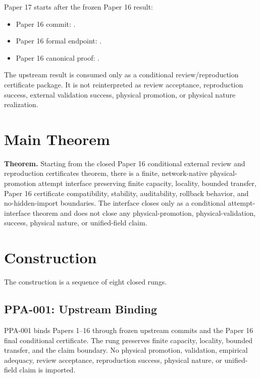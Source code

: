 \documentclass{article}
\begin{document}
Paper 17 starts after the frozen Paper 16 result:
\begin{itemize}
\item Paper 16 commit:
.
\item Paper 16 formal endpoint:
.
\item Paper 16 canonical proof:
.
\end{itemize}

The upstream result is consumed only as a conditional review/reproduction
certificate package. It is not reinterpreted as review acceptance,
reproduction success, external validation success, physical promotion, or
physical nature realization.

\section{Main Theorem}

\textbf{Theorem.} Starting from the closed Paper 16 conditional external
review and reproduction certificates theorem, there is a finite,
network-native physical-promotion attempt interface preserving finite
capacity, locality, bounded transfer, Paper 16 certificate compatibility,
stability, auditability, rollback behavior, and no-hidden-import boundaries.
The interface closes only as a conditional attempt-interface theorem and does
not close any physical-promotion, physical-validation, success, physical
nature, or unified-field claim.

\section{Construction}

The construction is a sequence of eight closed rungs.

\subsection{PPA-001: Upstream Binding}

PPA-001 binds Papers 1--16 through frozen upstream commits and the Paper 16
final conditional certificate. The rung preserves finite capacity, locality,
bounded transfer, and the claim boundary. No physical promotion, validation,
empirical adequacy, review acceptance, reproduction success, physical nature,
or unified-field claim is imported.
\end{document}
